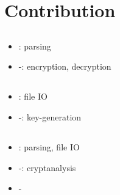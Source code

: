 \section{Contribution}



\subsection{\dd}
\begin{itemize}
\item \cry{} \cf: \cl{} parsing
\item \rsa-\cs: encryption, decryption
\end{itemize}

\subsection{\md}
\begin{itemize}
\item \cry{} \cf: file IO
\item \rsa-\cs: key-generation
\end{itemize}

\subsection{\vp}
\begin{itemize}
\item \cry{} \cf: \cl{} parsing, file IO
\item \rsa-\cs: cryptanalysis
\item \dummy-\cs
\end{itemize}
